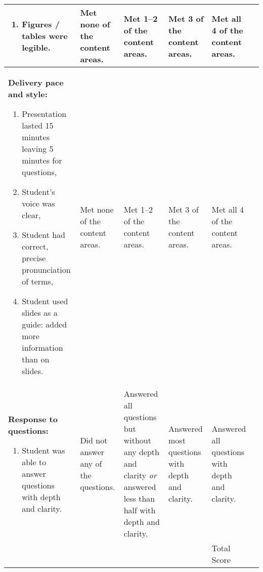 \documentclass[10pt, twoside]{article}
\begin{document}
\begin{landscape}
{\begin{longtable}[l]{@{}L{5cm}L{3.5cm}L{3.5cm}L{3.5cm}L{3.5cm}L{1.9cm}@{}}
\begin{enumerate}[itemsep=-0.25\baselineskip,align=left, leftmargin=*]
\item Figures / tables were legible.\end{enumerate}&%
Met none of the content areas. &%
Met 1--2 of the content areas. &%
Met 3 of the content areas. &%
Met all 4 of the content areas.&%
\\[-1em]
\midrule
\textbf{Delivery pace and style:}\par%
\vspace{-0.5\baselineskip}
\begin{enumerate}[itemsep=-0.25\baselineskip,align=left, leftmargin=*]
\item Presentation lasted 15 minutes leaving 5 minutes for questions, \par%
\item Student’s voice was clear, \par%
\item Student had correct, precise pronunciation of terms,\par%
\item Student used slides as a guide: added more information than on slides.\end{enumerate}&%
Met none of the content areas. &%
Met 1--2 of the content areas. &%
Met 3 of the content areas. &%
Met all 4 of the content areas.&%
\\[-1em]
\midrule
\textbf{Response to questions:}\par%
\vspace{-0.5\baselineskip}
\begin{enumerate}[itemsep=-0.25\baselineskip,align=left, leftmargin=*]
\item Student was able to answer questions with depth and clarity.\end{enumerate}&%
Did not answer any of the questions. &%
Answered all questions but without any depth and clarity \emph{or} answered less than half with depth and clarity. &%
Answered most questions with depth and clarity. &%
Answered all questions with depth and clarity.&%
\\
\midrule
& & & & \vspace{0.5in}\par\hfill\normalsize{Total Score\phantom{m}} & \\
\bottomrule
\end{longtable}
}%

\end{landscape}
\end{document}
